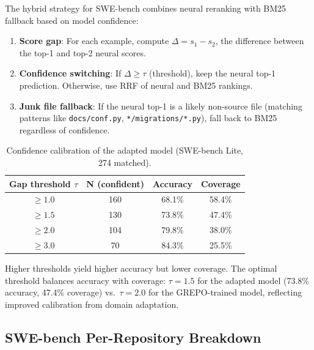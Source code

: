 \documentclass{article}
\begin{document}
The hybrid strategy for SWE-bench combines neural reranking with BM25 fallback based on model confidence:

\begin{enumerate}
    \item \textbf{Score gap}: For each example, compute $\Delta = s_1 - s_2$, the difference between the top-1 and top-2 neural scores.
    \item \textbf{Confidence switching}: If $\Delta \geq \tau$ (threshold), keep the neural top-1 prediction. Otherwise, use RRF of neural and BM25 rankings.
    \item \textbf{Junk file fallback}: If the neural top-1 is a likely non-source file (matching patterns like \texttt{docs/conf.py}, \texttt{*/migrations/*.py}), fall back to BM25 regardless of confidence.
\end{enumerate}

\begin{table}[h]
\centering
\small
\caption{Confidence calibration of the adapted model (SWE-bench Lite, 274 matched).}
\label{tab:confidence}
\begin{tabular}{cccc}
\toprule
\textbf{Gap threshold $\tau$} & \textbf{N (confident)} & \textbf{Accuracy} & \textbf{Coverage} \\
\midrule
$\geq 1.0$ & 160 & 68.1\% & 58.4\% \\
$\geq 1.5$ & 130 & 73.8\% & 47.4\% \\
$\geq 2.0$ & 104 & 79.8\% & 38.0\% \\
$\geq 3.0$ & 70 & 84.3\% & 25.5\% \\
\bottomrule
\end{tabular}
\end{table}

Higher thresholds yield higher accuracy but lower coverage.
The optimal threshold balances accuracy with coverage: $\tau = 1.5$ for the adapted model (73.8\% accuracy, 47.4\% coverage) vs.\ $\tau = 2.0$ for the GREPO-trained model, reflecting improved calibration from domain adaptation.


\subsection{SWE-bench Per-Repository Breakdown}
\label{app:perrepo}
\end{document}
